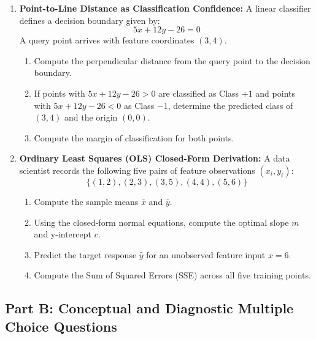 \begin{enumerate}
    \item \textbf{Point-to-Line Distance as Classification Confidence:} A linear classifier defines a decision boundary given by:
    $$5x + 12y - 26 = 0$$
    A query point arrives with feature coordinates $(3, 4)$.
    \begin{enumerate}
        \item Compute the perpendicular distance from the query point to the decision boundary.
        \item If points with $5x + 12y - 26 > 0$ are classified as Class $+1$ and points with $5x + 12y - 26 < 0$ as Class $-1$, determine the predicted class of $(3, 4)$ and the origin $(0, 0)$.
        \item Compute the margin of classification for both points.
    \end{enumerate}

    \item \textbf{Ordinary Least Squares (OLS) Closed-Form Derivation:} A data scientist records the following five pairs of feature observations $(x_i, y_i)$:
    $$\{(1, 2), (2, 3), (3, 5), (4, 4), (5, 6)\}$$
    \begin{enumerate}
        \item Compute the sample means $\bar{x}$ and $\bar{y}$.
        \item Using the closed-form normal equations, compute the optimal slope $m$ and y-intercept $c$.
        \item Predict the target response $\hat{y}$ for an unobserved feature input $x = 6$.
        \item Compute the Sum of Squared Errors (SSE) across all five training points.
    \end{enumerate}
\end{enumerate}

\subsection*{Part B: Conceptual and Diagnostic Multiple Choice Questions}


